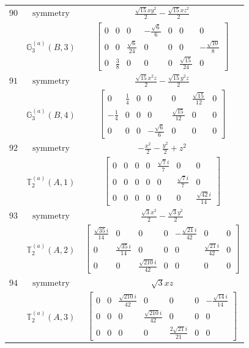 \documentclass[fleqn,8pt,landscape]{jsarticle}
\begin{document}
\begin{longtable}{ccc}
$ 90 $ & $ \text{symmetry} $ & $ \frac{\sqrt{15} x y^{2}}{2} - \frac{\sqrt{15} x z^{2}}{2} $ \\
$  $ & $ \mathbb{G}_{3}^{(a)}(B,3) $ & $ \begin{bmatrix} 0 & 0 & 0 & - \frac{\sqrt{6}}{6} & 0 & 0 & 0 \\ 0 & 0 & \frac{\sqrt{6}}{24} & 0 & 0 & 0 & - \frac{\sqrt{10}}{8} \\ 0 & \frac{3}{8} & 0 & 0 & 0 & \frac{\sqrt{15}}{24} & 0 \end{bmatrix} $ \\ \hline
$ 91 $ & $ \text{symmetry} $ & $ \frac{\sqrt{15} x^{2} z}{2} - \frac{\sqrt{15} y^{2} z}{2} $ \\
$  $ & $ \mathbb{G}_{3}^{(a)}(B,4) $ & $ \begin{bmatrix} 0 & \frac{1}{4} & 0 & 0 & 0 & \frac{\sqrt{15}}{12} & 0 \\ - \frac{1}{4} & 0 & 0 & 0 & \frac{\sqrt{15}}{12} & 0 & 0 \\ 0 & 0 & 0 & - \frac{\sqrt{6}}{6} & 0 & 0 & 0 \end{bmatrix} $ \\ \hline
$ 92 $ & $ \text{symmetry} $ & $ - \frac{x^{2}}{2} - \frac{y^{2}}{2} + z^{2} $ \\
$  $ & $ \mathbb{T}_{2}^{(a)}(A,1) $ & $ \begin{bmatrix} 0 & 0 & 0 & 0 & \frac{\sqrt{7} i}{7} & 0 & 0 \\ 0 & 0 & 0 & 0 & 0 & \frac{\sqrt{7} i}{7} & 0 \\ 0 & 0 & 0 & 0 & 0 & 0 & \frac{\sqrt{42} i}{14} \end{bmatrix} $ \\ \hline
$ 93 $ & $ \text{symmetry} $ & $ \frac{\sqrt{3} x^{2}}{2} - \frac{\sqrt{3} y^{2}}{2} $ \\
$  $ & $ \mathbb{T}_{2}^{(a)}(A,2) $ & $ \begin{bmatrix} \frac{\sqrt{35} i}{14} & 0 & 0 & 0 & - \frac{\sqrt{21} i}{42} & 0 & 0 \\ 0 & \frac{\sqrt{35} i}{14} & 0 & 0 & 0 & \frac{\sqrt{21} i}{42} & 0 \\ 0 & 0 & \frac{\sqrt{210} i}{42} & 0 & 0 & 0 & 0 \end{bmatrix} $ \\ \hline
$ 94 $ & $ \text{symmetry} $ & $ \sqrt{3} x z $ \\
$  $ & $ \mathbb{T}_{2}^{(a)}(A,3) $ & $ \begin{bmatrix} 0 & 0 & \frac{\sqrt{210} i}{42} & 0 & 0 & 0 & - \frac{\sqrt{14} i}{14} \\ 0 & 0 & 0 & \frac{\sqrt{210} i}{42} & 0 & 0 & 0 \\ 0 & 0 & 0 & 0 & \frac{2 \sqrt{21} i}{21} & 0 & 0 \end{bmatrix} $ \\ \hline

\end{longtable}
\end{document}
